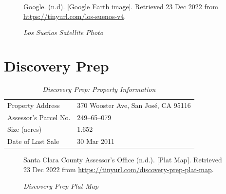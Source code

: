 \begin{figure}[hbtp]
  \caption[Los Sueños Satellite Photo]{\textit{Los Sueños Satellite Photo}}
  \label{fig:los-sueños-sat-photo}
  {Google. (n.d). [Google Earth image]. Retrieved 23 Dec 2022 from \url{https://tinyurl.com/los-suenos-v4}.}
\end{figure}


\clearpage
\section{Discovery Prep}\label{sec:discover-prep-info}\indent

\begin{table}[htbp]
  \SingleSpacing%
  \caption[Discovery Prep: Property Information]{\textit{Discovery Prep: Property Information}}%
  \label{tab:discovery-prep-prop-info}
  \begin{tabular}{ll}
    \toprule
    Property Address      & 370 Wooster Ave, San José, CA 95116 \\
    Assessor's Parcel No. &  249–65–079 \\
    Size (acres)          & 1.652 \\
    Date of Last Sale     & 30 Mar 2011\\
    \bottomrule
  \end{tabular}
\end{table}

\begin{figure}[hbtp]
  \caption[Discovery Prep Plat Map]{\textit{Discovery Prep Plat Map}}%
  \label{fig:discovery-prep-plat-map}
  {Santa Clara County Assessor's Office (n.d.). [Plat Map]. Retrieved 23 Dec 2022 from  \url{https://tinyurl.com/discovery-prep-plat-map}.}
\end{figure}

